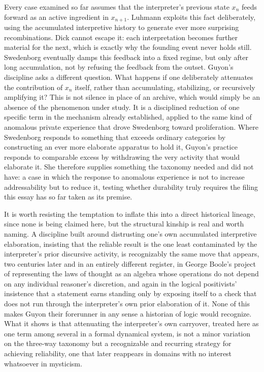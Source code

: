 \documentclass[11pt]{article}
\begin{document}
Every case examined so far assumes that the interpreter's previous state $x_n$ feeds forward as an active ingredient in $x_{n+1}$. Luhmann exploits this fact deliberately, using the accumulated interpretive history to generate ever more surprising recombinations. Dick cannot escape it: each interpretation becomes further material for the next, which is exactly why the founding event never holds still. Swedenborg eventually damps this feedback into a fixed regime, but only after long accumulation, not by refusing the feedback from the outset. Guyon's discipline asks a different question. What happens if one deliberately attenuates the contribution of $x_n$ itself, rather than accumulating, stabilizing, or recursively amplifying it? This is not silence in place of an archive, which would simply be an absence of the phenomenon under study. It is a disciplined reduction of one specific term in the mechanism already established, applied to the same kind of anomalous private experience that drove Swedenborg toward proliferation. Where Swedenborg responds to something that exceeds ordinary categories by constructing an ever more elaborate apparatus to hold it, Guyon's practice responds to comparable excess by withdrawing the very activity that would elaborate it. She therefore supplies something the taxonomy needed and did not have: a case in which the response to anomalous experience is not to increase addressability but to reduce it, testing whether durability truly requires the filing this essay has so far taken as its premise.

It is worth resisting the temptation to inflate this into a direct historical lineage, since none is being claimed here, but the structural kinship is real and worth naming. A discipline built around distrusting one's own accumulated interpretive elaboration, insisting that the reliable result is the one least contaminated by the interpreter's prior discursive activity, is recognizably the same move that appears, two centuries later and in an entirely different register, in George Boole's project of representing the laws of thought as an algebra whose operations do not depend on any individual reasoner's discretion, and again in the logical positivists' insistence that a statement earns standing only by exposing itself to a check that does not run through the interpreter's own prior elaboration of it. None of this makes Guyon their forerunner in any sense a historian of logic would recognize. What it shows is that attenuating the interpreter's own carryover, treated here as one term among several in a formal dynamical system, is not a minor variation on the three-way taxonomy but a recognizable and recurring strategy for achieving reliability, one that later reappears in domains with no interest whatsoever in mysticism.
\end{document}
